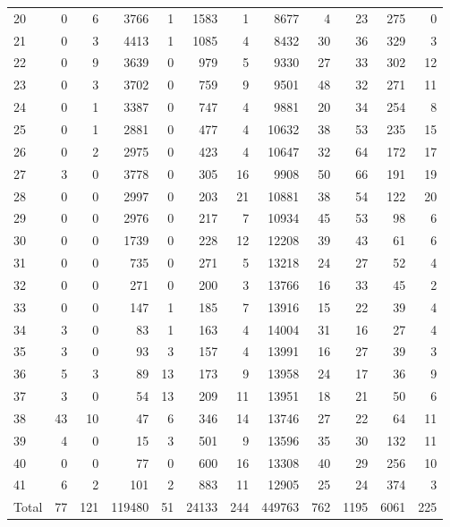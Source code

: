 \begin{table}
\begin{tabular}{lrrrrrrrrrrr}
20 & 0 & 6 & 3766 & 1 & 1583 & 1 & 8677 & 4 & 23 & 275 & 0 \\
21 & 0 & 3 & 4413 & 1 & 1085 & 4 & 8432 & 30 & 36 & 329 & 3 \\
22 & 0 & 9 & 3639 & 0 & 979 & 5 & 9330 & 27 & 33 & 302 & 12 \\
23 & 0 & 3 & 3702 & 0 & 759 & 9 & 9501 & 48 & 32 & 271 & 11 \\
24 & 0 & 1 & 3387 & 0 & 747 & 4 & 9881 & 20 & 34 & 254 & 8 \\
25 & 0 & 1 & 2881 & 0 & 477 & 4 & 10632 & 38 & 53 & 235 & 15 \\
26 & 0 & 2 & 2975 & 0 & 423 & 4 & 10647 & 32 & 64 & 172 & 17 \\
27 & 3 & 0 & 3778 & 0 & 305 & 16 & 9908 & 50 & 66 & 191 & 19 \\
28 & 0 & 0 & 2997 & 0 & 203 & 21 & 10881 & 38 & 54 & 122 & 20 \\
29 & 0 & 0 & 2976 & 0 & 217 & 7 & 10934 & 45 & 53 & 98 & 6 \\
30 & 0 & 0 & 1739 & 0 & 228 & 12 & 12208 & 39 & 43 & 61 & 6 \\
31 & 0 & 0 & 735 & 0 & 271 & 5 & 13218 & 24 & 27 & 52 & 4 \\
32 & 0 & 0 & 271 & 0 & 200 & 3 & 13766 & 16 & 33 & 45 & 2 \\
33 & 0 & 0 & 147 & 1 & 185 & 7 & 13916 & 15 & 22 & 39 & 4 \\
34 & 3 & 0 & 83 & 1 & 163 & 4 & 14004 & 31 & 16 & 27 & 4 \\
35 & 3 & 0 & 93 & 3 & 157 & 4 & 13991 & 16 & 27 & 39 & 3 \\
36 & 5 & 3 & 89 & 13 & 173 & 9 & 13958 & 24 & 17 & 36 & 9 \\
37 & 3 & 0 & 54 & 13 & 209 & 11 & 13951 & 18 & 21 & 50 & 6 \\
38 & 43 & 10 & 47 & 6 & 346 & 14 & 13746 & 27 & 22 & 64 & 11 \\
39 & 4 & 0 & 15 & 3 & 501 & 9 & 13596 & 35 & 30 & 132 & 11 \\
40 & 0 & 0 & 77 & 0 & 600 & 16 & 13308 & 40 & 29 & 256 & 10 \\
41 & 6 & 2 & 101 & 2 & 883 & 11 & 12905 & 25 & 24 & 374 & 3 \\
Total & 77 & 121 & 119480 & 51 & 24133 & 244 & 449763 & 762 & 1195 & 6061 & 225 \\
\end{tabular}
\end{table}
